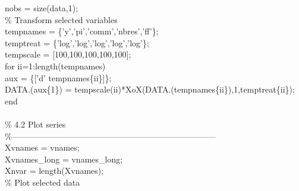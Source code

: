 \hspace{1mm}nobs = size(data,1); \\ 
\hspace{1mm}\textcolor{matlabgreen}{\% Transform selected variables }\\ 
\hspace{1mm}tempnames = \{\textcolor{matlabpurple}{'y'},\textcolor{matlabpurple}{'pi'},\textcolor{matlabpurple}{'comm'},\textcolor{matlabpurple}{'nbres'},\textcolor{matlabpurple}{'ff'}\}; \\ 
\hspace{1mm}temptreat = \{\textcolor{matlabpurple}{'log'},\textcolor{matlabpurple}{'log'},\textcolor{matlabpurple}{'log'},\textcolor{matlabpurple}{'log'},\textcolor{matlabpurple}{'log'}\}; \\ 
\hspace{1mm}tempscale = [100,100,100,100,100]; \\ 
\hspace{1mm}\textcolor{matlabblue}{for} ii=1:length(tempnames) \\ 
\hspace{1mm}\hspace{5mm} aux = \{[\textcolor{matlabpurple}{'d'} tempnames\{ii\}]\}; \\ 
\hspace{1mm}\hspace{5mm} DATA.(aux\{1\}) = tempscale(ii)*XoX(DATA.(tempnames\{ii\}),1,temptreat\{ii\}); \\ 
\hspace{1mm}\textcolor{matlabblue}{end} \\ 
\hspace{1mm} \\ 
\hspace{1mm}\textcolor{matlabgreen}{\% 4.2 Plot series }\\ 
\hspace{1mm}\textcolor{matlabgreen}{\%--------------------------------------------------------------------------  }\\ 
\hspace{1mm}Xvnames      = vnames; \\ 
\hspace{1mm}Xvnames\_long = vnames\_long; \\ 
\hspace{1mm}Xnvar        = length(Xvnames); \\ 
\hspace{1mm}\textcolor{matlabgreen}{\% Plot selected data }\\ 
